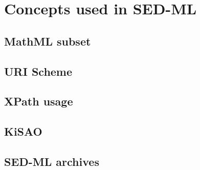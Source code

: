 \documentclass[pdftex,rgb,dvipsnames,svgnames,hyperref,table]{article}
\begin{document}

\tableofcontents
\newpage


  
  \newpage
  
  \newpage
  \section{Concepts used in SED-ML}

  \subsection{MathML subset}
  

  \subsection{URI Scheme}  
  
  
    \subsection{XPath usage}  
  
  
  \subsection{KiSAO}
  

  \subsection{SED-ML archives}
  

  

  

  

  
\end{document}
